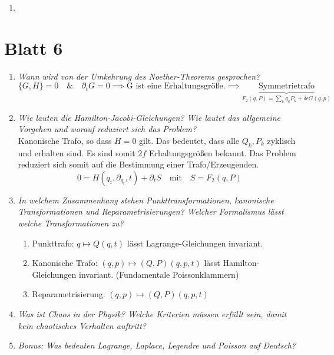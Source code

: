 \begin{enumerate}
    \item 
\end{enumerate}


\newpage

\section*{Blatt 6}
\begin{enumerate}
    \item \textit{Wann wird von der Umkehrung des Noether-Theorems gesprochen?} \\
        \begin{equation*}
            \{G,H\}=0 \quad \& \quad \partial_t G =0 \implies \text{G ist eine Erhaltungsgröße.} \implies \underbrace{\text{Symmetrietrafo}}_{F_2(q,P)= \sum_k q_k P_k + \delta \epsilon G(q,p)}
        \end{equation*}
    \item \textit{Wie lauten die Hamilton-Jacobi-Gleichungen? Wie lautet das allgemeine Vorgehen und worauf reduziert sich das Problem?} \\
        Kanonische Trafo, so dass $H=0$ gilt. Das bedeutet, dass alle $Q_k, P_k$ zyklisch und erhalten sind. Es sind somit $2f$ Erhaltungsgrößen bekannt. Das Problem reduziert sich somit auf die Bestimmung einer Trafo/Erzeugenden.
        \begin{equation*}
            0=H(q_i, \partial_{q_i}, t)+\partial_t S \quad \text{mit} \quad S=F_2(q, P)
        \end{equation*}
    \item \textit{In welchem Zusammenhang stehen Punkttransformationen, kanonische Transformationen und Reparametrisierungen? Welcher Formalismus lässt welche Transformationen zu?} \\
    \begin{enumerate}
        \item Punkttrafo: $q \mapsto Q(q,t) $ lässt Lagrange-Gleichungen invariant.
        \item Kanonische Trafo: $(q,p) \mapsto (Q,P)(q,p,t)$ lässt Hamilton-Gleichungen invariant. (Fundamentale Poissonklammern)
        \item Reparametrisierung: $(q,p) \mapsto (Q,P)(q,p,t)$
    \end{enumerate}
    \item \textit{Was ist Chaos in der Physik? Welche Kriterien müssen erfüllt sein, damit kein chaotisches Verhalten auftritt?} \\
    \item \textit{Bonus: Was bedeuten Lagrange, Laplace, Legendre und Poisson auf Deutsch?} \\
\end{enumerate}

